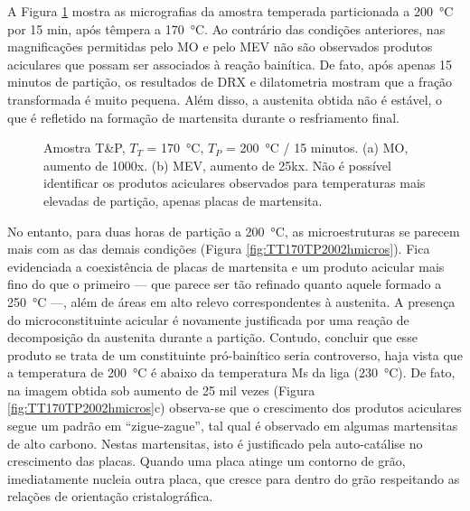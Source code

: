 A Figura \ref{fig:TT170TP200micros} mostra as micrografias da amostra temperada particionada a \SI{200}{\degreeCelsius} por 15 min, após têmpera a \SI{170}{\degreeCelsius}. Ao contrário das condições anteriores, nas magnificações permitidas pelo MO e pelo MEV não são observados produtos aciculares que possam ser associados à reação bainítica. De fato, após apenas 15 minutos de partição, os resultados de DRX e dilatometria mostram que a fração transformada é muito pequena. Além disso, a austenita obtida não é estável, o que é refletido na formação de martensita durante o resfriamento final. 

\begin{figure}
  \centering
  \quad
  \caption{Amostra T\&P, $T_T$ = \SI{170}{\degreeCelsius}, $T_P$ = \SI{200}{\degreeCelsius} / 15 minutos. (a) MO, aumento de 1000x. (b) MEV, aumento de 25kx. Não é possível identificar os produtos aciculares observados para temperaturas mais elevadas de partição, apenas placas de martensita.}
  \label{fig:TT170TP200micros}
\end{figure}

No entanto, para duas horas de partição a \SI{200}{\degreeCelsius}, as microestruturas se parecem mais com as das demais condições (Figura \ref{fig:TT170TP2002hmicros}). Fica evidenciada a coexistência de placas de martensita e um produto acicular mais fino do que o primeiro --- que parece ser tão refinado quanto aquele formado a \SI{250}{\degreeCelsius} ---, além de áreas em alto relevo correspondentes à austenita. A presença do microconstituinte acicular é novamente justificada por uma reação de decomposição da austenita durante a partição. Contudo, concluir que esse produto se trata de um constituinte pró-bainítico seria controverso, haja vista que a temperatura de \SI{200}{\degreeCelsius} é abaixo da temperatura Ms da liga (\SI{230}{\degreeCelsius}). De fato, na imagem obtida sob aumento de 25 mil vezes (Figura \ref{fig:TT170TP2002hmicros}c) observa-se que o crescimento dos produtos aciculares segue um padrão em ``zigue-zague'', tal qual é observado em algumas martensitas de alto carbono. Nestas martensitas, isto é justificado pela auto-catálise no crescimento das placas. Quando uma placa atinge um contorno de grão, imediatamente nucleia outra placa, que cresce para dentro do grão respeitando as relações de orientação cristalográfica.

